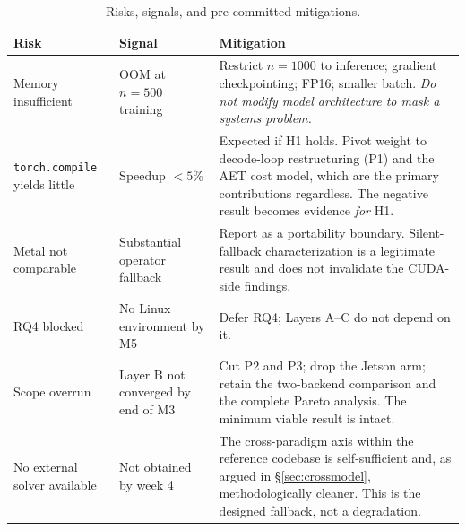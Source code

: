 \documentclass[11pt,a4paper,twocolumn]{article}
\begin{document}
\begin{table}[!tb]
\centering
\footnotesize
\begin{tabular}{@{}p{}p{}p{}@{}}
\toprule
\textbf{Risk} & \textbf{Signal} & \textbf{Mitigation} \\
\midrule
Memory insufficient & OOM at $n{=}500$ training & Restrict $n{=}1000$ to inference;
gradient checkpointing; FP16; smaller batch. \emph{Do not modify model architecture
to mask a systems problem.} \\
\texttt{torch.compile} yields little & Speedup $< 5\%$ & Expected if H1 holds.
Pivot weight to decode-loop restructuring (P1) and the AET cost model, which are the
primary contributions regardless. The negative result becomes evidence \emph{for}
H1. \\
Metal not comparable & Substantial operator fallback & Report as a portability
boundary. Silent-fallback characterization is a legitimate result and does not
invalidate the CUDA-side findings. \\
RQ4 blocked & No Linux environment by M5 & Defer RQ4; Layers A--C do not depend on
it. \\
Scope overrun & Layer B not converged by end of M3 & Cut P2 and P3; drop the Jetson
arm; retain the two-backend comparison and the complete Pareto analysis. The minimum
viable result is intact. \\
No external solver available & Not obtained by week 4 & The cross-paradigm axis
within the reference codebase is self-sufficient and, as argued in
\S\ref{sec:crossmodel}, methodologically cleaner. This is the designed fallback, not
a degradation. \\
\bottomrule
\end{tabular}
\caption{Risks, signals, and pre-committed mitigations.}
\label{tab:risks}
\end{table}

\clearpage


\end{document}
